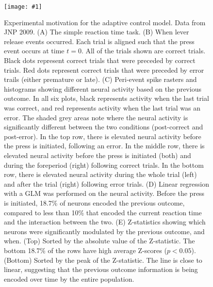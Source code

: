 \documentclass[11pt]{article}
\newcommand{\scalefigone}[3]{
  \begin{figure}[ht!]
    \centering
    \texttt{[image: \#1]}
    \caption{#3}
    \label{#1}
  \end{figure}}
\begin{document}
\scalefigone{fig2}{1.0}{
  Experimental motivation for the adaptive control model. Data from JNP 2009.
  (A) The simple reaction time task.
  (B) When lever release events occurred.
  Each trial is aligned such that the press event
  occurs at time $t=0$.
  All of the trials shown are correct trials.
  Black dots represent correct trials
  that were preceded by correct trials.
  Red dots represent correct trials
  that were preceded by error trails
  (either premature or late).
  (C) Peri-event spike rasters and histograms
  showing different neural activity
  based on the previous outcome.
  In all six plots, black represents activity
  when the last trial was correct, and red
  represents activity when the last trial was an error.
  The shaded grey areas note where
  the neural activity is significantly different
  between the two conditions (post-correct and post-error).
  In the top row, there is elevated neural activity
  before the press is initiated, following an error.
  In the middle row, there is elevated neural activity
  before the press is initiated (both)
  and during the foreperiod (right)
  following correct trials.
  In the bottom row, there is elevated neural activity
  during the whole trial (left)
  and after the trial (right)
  following error trials.
  (D) Linear regression with a GLM was performed
  on the neural activity.
  Before the press is initiated,
  18.7\% of neurons encoded the previous outcome,
  compared to less than 10\% that
  encoded the current reaction time
  and the interaction between the two.
  (E) Z-statistics showing which neurons were significantly
  modulated by the previous outcome, and when.
  (Top) Sorted by the absolute value of the Z-statistic.
  The bottom 18.7\% of the rows have high average Z-scores
  ($p < 0.05$).
  (Bottom) Sorted by the peak of the Z-statistic.
  The line is close to linear, suggesting that the
  previous outcome information is being encoded over time
  by the entire population.
}
\end{document}
